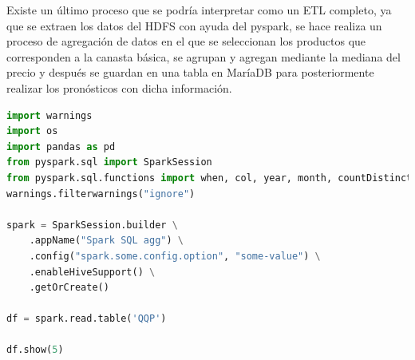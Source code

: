\documentclass{article}
\begin{document}
Existe un último proceso que se podría interpretar como un ETL completo, ya que se extraen los datos del HDFS con ayuda del pyspark, se hace realiza un proceso de agregación de datos en el que se seleccionan los productos que corresponden a la canasta básica, se agrupan y agregan mediante la mediana del precio y después se guardan en una tabla en MaríaDB para posteriormente realizar los pronósticos con dicha información.

\begin{lstlisting}[language=Python, caption={python version}]
import warnings
import os   
import pandas as pd
from pyspark.sql import SparkSession
from pyspark.sql.functions import when, col, year, month, countDistinct, avg, stddev, max, min, expr, asc, desc
warnings.filterwarnings("ignore")  

spark = SparkSession.builder \
    .appName("Spark SQL agg") \
    .config("spark.some.config.option", "some-value") \
    .enableHiveSupport() \
    .getOrCreate()

df = spark.read.table('QQP')

df.show(5)


\end{lstlisting}
\end{document}
